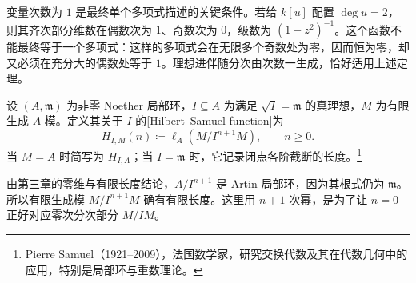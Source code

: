 \ProseParagraphBreak

变量次数为 \(1\) 是最终单个多项式描述的关键条件。若给 \(k[u]\) 配置 \(\deg u=2\)，则其齐次部分维数在偶数次为 \(1\)、奇数次为 \(0\)，级数为 \((1-z^2)^{-1}\)。这个函数不能最终等于一个多项式：这样的多项式会在无限多个奇数处为零，因而恒为零，却又必须在充分大的偶数处等于 \(1\)。理想进伴随分次由次数一生成，恰好适用上述定理。

\begin{definition}\label{g5:def:hilbert-samuel-function}
	设 \((A,\mathfrak m)\) 为非零 Noether 局部环，\(I\subseteq A\) 为满足 \(\sqrt I=\mathfrak m\) 的真理想，\(M\) 为有限生成 \(A\) 模。定义其关于 \(I\) 的[Hilbert--Samuel function]为
	\[
		H_{I,M}(n)\coloneqq\ell_A(M/I^{n+1}M),\qquad n\geq0.
	\]
	当 \(M=A\) 时简写为 \(H_{I,A}\)；当 \(I=\mathfrak m\) 时，它记录闭点各阶截断的长度。\footnote{Pierre Samuel（1921--2009），法国数学家，研究交换代数及其在代数几何中的应用，特别是局部环与重数理论。}
\end{definition}

由第三章的零维与有限长度结论，\(A/I^{n+1}\) 是 Artin 局部环，因为其根式仍为 \(\mathfrak m\)。所以有限生成模 \(M/I^{n+1}M\) 确有有限长度。这里用 \(n+1\) 次幂，是为了让 \(n=0\) 正好对应零次分次部分 \(M/IM\)。


